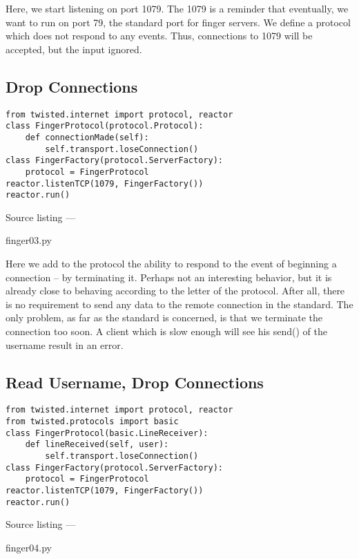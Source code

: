 Here, we start listening on port 1079. The 1079 is a reminder that eventually, we want to run on port 79, the standard port for finger servers. We define a protocol which does not respond to any events. Thus, connections to 1079 will be accepted, but the input ignored.

\subsection{Drop Connections}
\begin{verbatim}
from twisted.internet import protocol, reactor
class FingerProtocol(protocol.Protocol):
    def connectionMade(self):
        self.transport.loseConnection()
class FingerFactory(protocol.ServerFactory):
    protocol = FingerProtocol
reactor.listenTCP(1079, FingerFactory())
reactor.run()
\end{verbatim}\parbox[b]{\linewidth}{\begin{center}Source listing --- \begin{em}finger03.py\end{em}\end{center}}

Here we add to the protocol the ability to respond to the event of beginning a connection -- by terminating it.  Perhaps not an interesting behavior, but it is already close to behaving according to the letter of the protocol. After all, there is no requirement to send any data to the remote connection in the standard.  The only problem, as far as the standard is concerned, is that we terminate the connection too soon. A client which is slow enough will see his send() of the username result in an error.

\subsection{Read Username, Drop Connections}
\begin{verbatim}
from twisted.internet import protocol, reactor
from twisted.protocols import basic
class FingerProtocol(basic.LineReceiver):
    def lineReceived(self, user):
        self.transport.loseConnection()
class FingerFactory(protocol.ServerFactory):
    protocol = FingerProtocol
reactor.listenTCP(1079, FingerFactory())
reactor.run()
\end{verbatim}\parbox[b]{\linewidth}{\begin{center}Source listing --- \begin{em}finger04.py\end{em}\end{center}}


